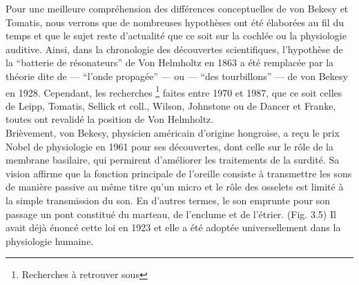 Pour une meilleure compréhension des différences conceptuelles de von Bekesy et Tomatis, nous 
verrons que de nombreuses  hypothèses ont été élaborées au fil du temps et que le sujet reste 
d'actualité que ce soit sur la cochlée ou  la physiologie auditive. %
Ainsi, dans la chronologie des découvertes scientifiques,  l'hypothèse de la ``batterie de
	résonateurs''  de Von Helmholtz en 1863  a été remplacée par la
théorie dite de  --- ``l'onde propagée'' --- ou --- ``des
tourbillons'' ---  de von Bekesy en 1928.
Cependant, 
les recherches  \footnote{ Recherches à retrouver sous\autocite[24--28] {auriol:cle}}
faites entre 1970 et 1987, que ce soit celles 
de  Leipp,  %
Tomatis,  %
Sellick et coll., %
 Wilson, %
Johnstone %
ou de Dancer et
Franke,  %
 toutes ont revalidé la position de Von Helmholtz.
\\
 Brièvement, von Bekesy, physicien américain d'origine hongroise, a reçu le prix
 Nobel de physiologie  en 1961 pour ses découvertes, dont celle sur le rôle de la membrane basilaire, qui 
 permirent 
 d'améliorer les traitements de la surdité. Sa vision affirme que la fonction principale de l'oreille 
 consiste à transmettre les sons de manière passive au même titre qu'un micro et le rôle des 
 osselets
 est limité à la simple transmission du son. En d'autres termes, le son emprunte pour son 
 passage un pont  constitué du marteau, de 
 l'enclume et de l'étrier. (Fig. 3.5) Il avait déjà énoncé cette loi en 1923  et elle a été adoptée
 universellement dans la physiologie humaine.
